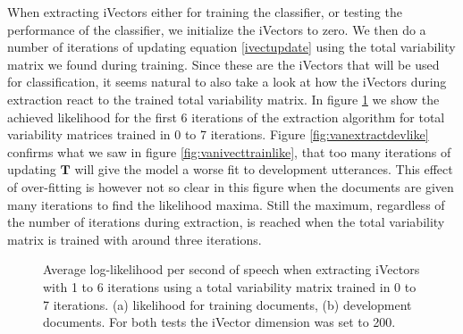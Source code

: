 When extracting iVectors either for training the classifier, or testing the performance of the classifier, we initialize the iVectors to zero. We then do a number of iterations of updating equation \ref{ivectupdate} using the total variability matrix we found during training. Since these are the iVectors that will be used for classification, it seems natural to also take a look at how the iVectors during extraction react to the trained total variability matrix. In figure \ref{fig:vanextractlike} we show the achieved likelihood for the first 6 iterations of the extraction algorithm for total variability matrices trained in 0 to 7 iterations. Figure \ref{fig:vanextractdevlike} confirms what we saw in figure \ref{fig:vanivecttrainlike}, that too many iterations of updating $\mathbf{T}$ will give the model a worse fit to development utterances. This effect of over-fitting is however not so clear in this figure when the documents are given many iterations to find the likelihood maxima. Still the maximum, regardless of the number of iterations during extraction, is reached when the total variability matrix is trained with around three iterations.

\begin{figure}[hbt!]
	\begin{center}
	\end{center}
	\caption{Average log-likelihood per second of speech when extracting iVectors with 1 to 6 iterations using a total variability matrix trained in 0 to 7 iterations. (a) likelihood for training documents, (b) development documents. For both tests the iVector dimension was set to 200.}
	\label{fig:vanextractlike}
\end{figure}

